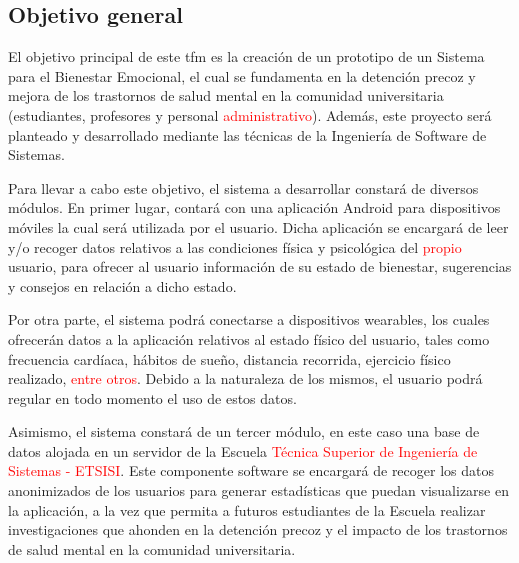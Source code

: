     \subsection{Objetivo general}

        El objetivo principal de este \gls{tfm} es la creación de un prototipo de un Sistema para el Bienestar Emocional, el cual se fundamenta en la detención precoz y mejora de los trastornos de salud mental en la comunidad universitaria (estudiantes, profesores y personal \textcolor{red}{administrativo}). %
        Además, este proyecto será planteado y desarrollado mediante las técnicas de la Ingeniería de Software de Sistemas.
    
        Para llevar a cabo este objetivo, el sistema a desarrollar constará de diversos módulos. En primer lugar, contará con una aplicación Android para dispositivos móviles la cual será utilizada por el usuario. Dicha aplicación se encargará de leer y/o recoger datos relativos a las condiciones física y psicológica del \textcolor{red}{propio} usuario, para ofrecer al usuario información de su estado de bienestar, sugerencias y consejos en relación a dicho estado.
    
        Por otra parte, el sistema podrá conectarse a dispositivos \glspl{wearable}, los cuales ofrecerán datos a la aplicación relativos al estado físico del usuario, tales como frecuencia cardíaca, hábitos de sueño, distancia recorrida, ejercicio físico realizado, \textcolor{red}{entre otros}. %
        Debido a la naturaleza de los mismos, el usuario podrá regular en todo momento el uso de estos datos.
    
        Asimismo, el sistema constará de un tercer módulo, en este caso una base de datos alojada en un servidor de la Escuela \textcolor{red}{Técnica Superior de Ingeniería de Sistemas - ETSISI}. Este componente software se encargará de recoger los datos anonimizados de los usuarios para generar estadísticas que puedan visualizarse en la aplicación, a la vez que permita a futuros estudiantes de la Escuela realizar investigaciones que ahonden en la detención precoz y el impacto de los trastornos de salud mental en la comunidad universitaria.


